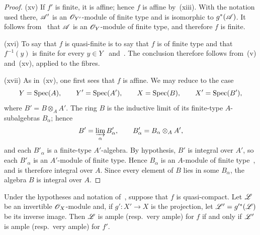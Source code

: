 \begin{proof}

\textnormal{(xv)} If $f'$ is finite, it is affine; hence $f$ is affine
by~\textnormal{(xiii)}. With the notation used there, $\mathscr{A}'$ is an
$\mathscr{O}_{Y'}$-module of finite type and is isomorphic to
$g^*(\mathscr{A})$. It follows from~ that $\mathscr{A}$ is an
$\mathscr{O}_Y$-module of finite type, and therefore $f$ is finite.

\textnormal{(xvi)} To say that $f$ is quasi-finite is to say that $f$
is of finite type and that $f^{-1}(y)$ is finite for every
$y\in Y$~ and~. The conclusion
therefore follows from~\textnormal{(v)} and~\textnormal{(xv)}, applied
to the fibres.

\textnormal{(xvii)} As in~\textnormal{(xv)}, one first sees that $f$ is
affine. We may reduce to the case
\[
  Y=\operatorname{Spec}(A),\qquad Y'=\operatorname{Spec}(A'),\qquad
  X=\operatorname{Spec}(B),\qquad X'=\operatorname{Spec}(B'),
\]
where $B'=B\otimes_A A'$. The ring $B$ is the inductive limit of its
finite-type $A$-subalgebras $B_\alpha$; hence
\[
  B'=\varinjlim_\alpha B'_\alpha,\qquad
  B'_\alpha=B_\alpha\otimes_A A',
\]
and each $B'_\alpha$ is a finite-type $A'$-algebra. By hypothesis,
$B'$ is integral over $A'$, so each $B'_\alpha$ is an $A'$-module of
finite type. Hence $B_\alpha$ is an $A$-module of finite
type~, and is therefore integral over $A$. Since every
element of $B$ lies in some $B_\alpha$, the algebra $B$ is integral
over $A$.
\end{proof}

\begin{corollary}[2.7.2]
\label{IV.2.7.2}
Under the hypotheses and notation of~, suppose that $f$
is quasi-compact. Let $\mathscr{L}$ be an invertible $\mathscr{O}_X$-module and,
if $g':X'\to X$ is the projection, let
$\mathscr{L}'=g'^*(\mathscr{L})$ be its inverse image. Then $\mathscr{L}$ is ample
\textnormal{(}resp.\ very ample\textnormal{)} for $f$ if and only if
$\mathscr{L}'$ is ample \textnormal{(}resp.\ very ample\textnormal{)} for
$f'$.
\end{corollary}

